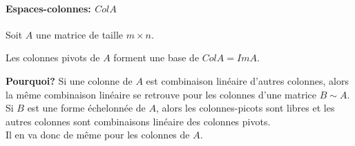 \paragraph{Espaces-colonnes: $ColA$}
Soit $A$ une matrice de taille $m \times n$.
\begin{theoreme}
    Les colonnes pivots de $A$ forment une base de $ColA = Im A$.
\end{theoreme}
\textbf{Pourquoi?} Si une colonne de $A$ est combinaison linéaire d'autres colonnes, alors la même combinaison linéaire se retrouve pour les colonnes d'une matrice $B \sim A$. \\
Si $B$ est une forme échelonnée de $A$, alors les colonnes-picots sont libres et les autres colonnes sont combinaisons linéaire des colonnes pivots.
\\
Il en va donc de même pour les colonnes de $A$.